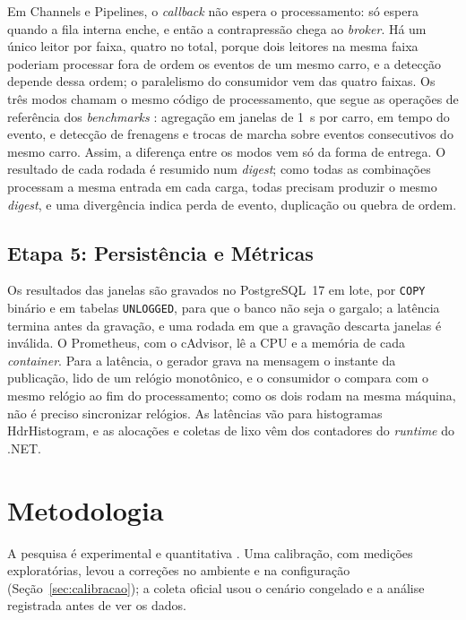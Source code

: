 \documentclass[12pt]{article}
\begin{document}
Em Channels e Pipelines, o \textit{callback} não espera o processamento: só espera quando a fila
interna enche, e então a contrapressão chega ao \textit{broker}. Há um único leitor por faixa,
quatro no total, porque dois leitores na mesma faixa poderiam processar fora de ordem os
eventos de um mesmo carro, e a detecção depende dessa ordem; o paralelismo do consumidor vem
das quatro faixas. Os três modos chamam o mesmo código de processamento, que segue as operações de referência dos
\textit{benchmarks} \cite{arasu:2004,mutschler:2013}: agregação em janelas de 1~s por carro, em
tempo do evento, e detecção de frenagens e trocas de marcha sobre eventos consecutivos do
mesmo carro. Assim, a diferença entre os modos vem só da forma de entrega. O resultado de
cada rodada é resumido num \textit{digest}; como todas as combinações processam a mesma
entrada em cada carga, todas precisam produzir o mesmo \textit{digest}, e uma divergência indica
perda de evento, duplicação ou quebra de ordem.

\subsection{Etapa 5: Persistência e Métricas}
\label{sec:coleta}

Os resultados das janelas são gravados no PostgreSQL~17 em lote, por \texttt{COPY}
binário e em tabelas \texttt{UNLOGGED}, para que o banco não seja o gargalo; a latência
termina antes da gravação, e uma rodada em que a gravação descarta janelas é inválida. O
Prometheus, com o cAdvisor, lê a CPU e a memória de cada \textit{container}. Para a latência, o
gerador grava na mensagem o instante da publicação, lido de um relógio monotônico, e o
consumidor o compara com o mesmo relógio ao fim do processamento; como os dois rodam na
mesma máquina, não é preciso sincronizar relógios. As latências vão para histogramas
HdrHistogram, e as alocações e coletas de lixo vêm dos contadores do \textit{runtime} do .NET.


\section{Metodologia}
\label{sec:metodologia}

A pesquisa é experimental e quantitativa \cite{jain:1991}. Uma calibração, com medições
exploratórias, levou a correções no ambiente e na configuração
(Seção~\ref{sec:calibracao}); a coleta oficial usou o cenário congelado e a análise
registrada antes de ver os dados.
\end{document}
